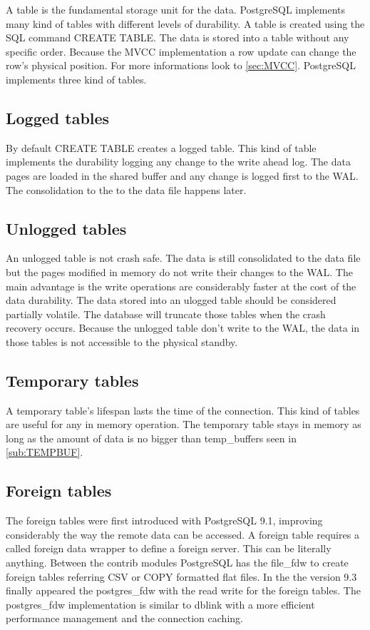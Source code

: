 A table is the fundamental storage unit for the data. PostgreSQL implements many kind of tables
with different levels of durability. A table is created using the SQL command CREATE TABLE. The data
is stored into a table without any specific order. Because the MVCC implementation a row update can
change the row's physical position. For more informations look to \ref{sec:MVCC}. PostgreSQL
implements three kind of tables.

\subsection{Logged tables}
By default CREATE TABLE creates a logged table. This kind of table implements the durability
logging any change to the write ahead log. The data pages are loaded in the shared buffer and any
change is logged first to the WAL. The consolidation to the to the data file happens later. 

\subsection{Unlogged tables}
\label{sub:UNLOGGEDTABLES}
An unlogged table is not crash safe. The data is still consolidated to the data file but the pages
modified in memory do not write their changes to the WAL. The main advantage is the write operations
are considerably faster at the cost of the data durability. The data stored into an ulogged table
should be considered partially volatile. The database will truncate those tables when the crash
recovery occurs. Because the unlogged table don't write to the WAL, the data in those tables is not
accessible to the physical standby. 


\subsection{Temporary tables}
A temporary table's lifespan lasts the time of the connection. This kind of 
tables are useful for any in memory operation. The temporary table stays in 
memory as long as the amount of data is no bigger than 
temp\_buffers seen in \ref{sub:TEMPBUF}. 


\subsection{Foreign tables}
The foreign tables were first introduced with PostgreSQL 9.1, improving 
considerably the way the remote data can be accessed. 
A foreign table requires a called foreign data wrapper to define a foreign 
server. This can be literally anything. Between the contrib modules PostgreSQL 
has the file\_fdw to create foreign tables referring CSV or COPY formatted flat 
files. In the the version 9.3 finally appeared the postgres\_fdw with the read 
write for the foreign tables. The postgres\_fdw implementation is similar to 
dblink with a more efficient performance management and the connection caching.

